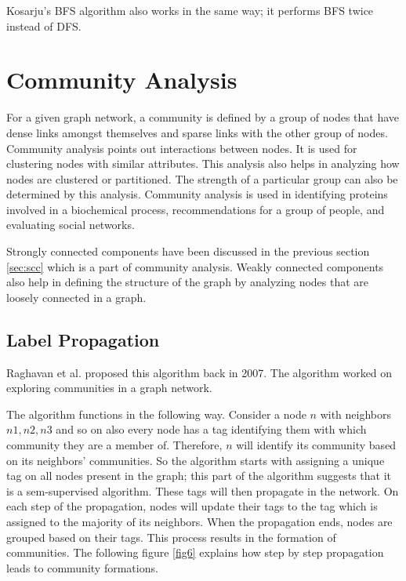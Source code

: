 \documentclass[journal,twoside,web]{ieeecolor}
\begin{document}
Kosarju's BFS algorithm also works in the same way; it performs BFS twice instead of DFS.

\section{Community Analysis}
\label{sec:community}
For a given graph network, a community is defined by a group of nodes that have dense links amongst themselves and sparse links with the other group of nodes. Community analysis points out interactions between nodes. It is used for clustering nodes with similar attributes. This analysis also helps in analyzing how nodes are clustered or partitioned. The strength of a particular group can also be determined by this analysis. Community analysis is used in identifying proteins involved in a biochemical process, recommendations for a group of people, and evaluating social networks. 

Strongly connected components have been discussed in the previous section \ref{sec:scc} which is a part of community analysis. Weakly connected components also help in defining the structure of the graph by analyzing nodes that are loosely connected in a graph.

\subsection{Label Propagation}
Raghavan et al. proposed this algorithm back in 2007\cite{16}. The algorithm worked on exploring communities in a graph network. 

The algorithm functions in the following way. Consider a node $n$ with neighbors $n1, n2, n3$ and so on also every node has a tag identifying them with which community they are a member of. Therefore, $n$ will identify its community based on its neighbors' communities. So the algorithm starts with assigning a unique tag on all nodes present in the graph; this part of the algorithm suggests that it is a sem-supervised algorithm. These tags will then propagate in the network. On each step of the propagation, nodes will update their tags to the tag which is assigned to the majority of its neighbors. When the propagation ends, nodes are grouped based on their tags. This process results in the formation of communities. The following figure \ref{fig6} explains how step by step propagation leads to community formations.
\end{document}
